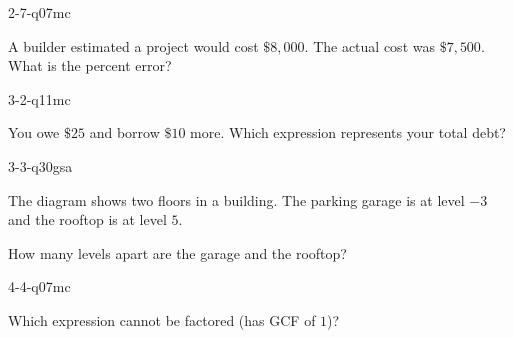 \begin{practiceQuestion}{2-7-q07}{mc}
\begin{questionText}
A builder estimated a project would cost $\$8{,}000$. The actual cost was $\$7{,}500$. What is the percent error?
\end{questionText}
\end{practiceQuestion}

\begin{practiceQuestion}{3-2-q11}{mc}
\begin{questionText}
You owe $\$25$ and borrow $\$10$ more. Which expression represents your total debt?
\end{questionText}
\end{practiceQuestion}

\begin{practiceQuestion}{3-3-q30}{gsa}
\begin{questionText}
The diagram shows two floors in a building. The parking garage is at level $-3$ and the rooftop is at level $5$.

\begin{center}
\end{center}

How many levels apart are the garage and the rooftop?
\end{questionText}
\end{practiceQuestion}

\begin{practiceQuestion}{4-4-q07}{mc}
\begin{questionText}
Which expression cannot be factored (has GCF of $1$)?
\end{questionText}
\end{practiceQuestion}


